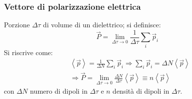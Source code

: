 \documentclass[a4paper]{scrartcl}
\numberwithin{equation}{subsection}
\theoremstyle{style1}
\begin{document}
\subsubsection{Vettore di polarizzazione elettrica}
Porzione $\Delta \tau $ di volume di un dielettrico; si definisce:
\begin{equation}
	\vec{P} = \lim_{\Delta \tau  \to 0} \frac{1}{\Delta \tau }\sum_{i}^{} \vec{p}_i
\end{equation}
Si riscrive come:
\begin{equation}
	\begin{split}
		&\left\langle \vec{p} \right\rangle = \frac{1}{\Delta N} \sum_{i}^{} \vec{p}_i \Rightarrow \sum_{i}^{} \vec{p}_i = \Delta N \left\langle \vec{p} \right\rangle\\
		&\Rightarrow \vec{P} = \lim_{\Delta \tau\to 0} \frac{\Delta N}{\Delta \tau } \left\langle \vec{p} \right\rangle\equiv n \left\langle \vec{p} \right\rangle
	\end{split}
\end{equation}
con $\Delta N$ numero di dipoli in $\Delta \tau $ e $n$ densit\`a di dipoli in $\Delta \tau $.
\end{document}
